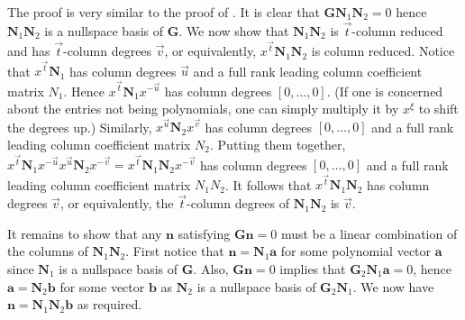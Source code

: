 \begin{pf}
The proof is very similar to the proof of .
It is clear that $\mathbf{G}\mathbf{N}_{1}\mathbf{N}_{2}=0$ hence
$\mathbf{N}_{1}\mathbf{N}_{2}$ is a nullspace basis of $\mathbf{G}$.
We now show that $\mathbf{N}_{1}\mathbf{N}_{2}$ is $\vec{t}$-column
reduced and has $\vec{t}$-column degrees $\vec{v}$, or equivalently,
$x^{\vec{t}}\mathbf{N}_{1}\mathbf{N}_{2}$ is column reduced. Notice
that $x^{\vec{t}}\mathbf{N}_{1}$ has column degrees $\vec{u}$ and
a full rank leading column coefficient matrix $N_{1}$. Hence $x^{\vec{t}}\mathbf{N}_{1}x^{-\vec{u}}$
has column degrees $\left[0,\dots,0\right]$. (If one is concerned
about the entries not being polynomials, one can simply multiply it
by $x^{\xi}$ to shift the degrees up.) Similarly, $x^{\vec{u}}\mathbf{N}_{2}x^{\vec{v}}$
has column degrees $\left[0,\dots,0\right]$ and a full rank leading
column coefficient matrix $N_{2}$. Putting them together, $x^{\vec{t}}\mathbf{N}_{1}x^{-\vec{u}}x^{\vec{u}}\mathbf{N}_{2}x^{-\vec{v}}=x^{\vec{t}}\mathbf{N}_{1}\mathbf{N}_{2}x^{-\vec{v}}$
has column degrees $[0,\dots,0]$ and a full rank leading column coefficient
matrix $N_{1}N_{2}$. It follows that $x^{\vec{t}}\mathbf{N}_{1}\mathbf{N}_{2}$
has column degrees $\vec{v}$, or equivalently, the $\vec{t}$-column
degrees of $\mathbf{N}_{1}\mathbf{N}_{2}$ is $\vec{v}$.

It remains to show that any $\mathbf{n}$ satisfying $\mathbf{G}\mathbf{n}=0$
must be a linear combination of the columns of $\mathbf{N}_{1}\mathbf{N}_{2}$.
First notice that $\mathbf{n}=\mathbf{N}_{1}\mathbf{a}$ for some
polynomial vector $\mathbf{a}$ since $\mathbf{N}_{1}$ is a nullspace
basis of $\mathbf{G}$. Also, $\mathbf{G}\mathbf{n}=0$ implies that
$\mathbf{G}_{2}\mathbf{N}_{1}\mathbf{a}=0$, hence $\mathbf{a}=\mathbf{N}_{2}\mathbf{b}$
for some vector $\mathbf{b}$ as $\mathbf{N}_{2}$ is a nullspace
basis of $\mathbf{G}_{2}\mathbf{N}_{1}$. We now have $\mathbf{n}=\mathbf{N}_{1}\mathbf{N}_{2}\mathbf{b}$
as required.\end{pf}
